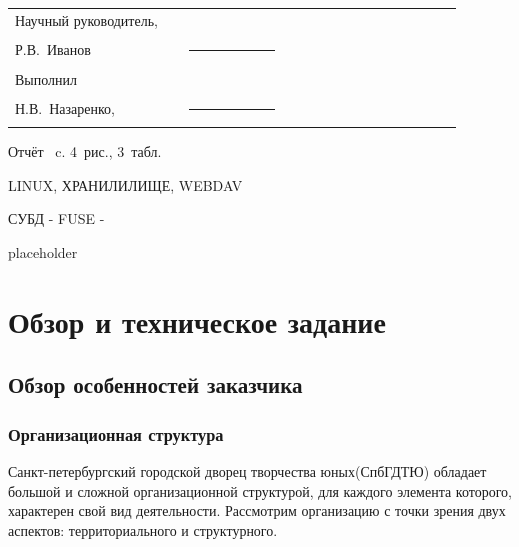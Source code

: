 \documentclass[utf8,usehyperref,12pt]{G7-32}
\begin{document}

\frontmatter %



\Executors %
\begin{longtable}{p{0.35\linewidth}p{0.2\linewidth}p{0.35\linewidth}}
Научный руководитель, 	&		&	\\
Р.В.~Иванов	&\rule{1\linewidth}{0.1pt}	&  \\ \vspace{1cm}

Выполнил  &		&	\\
Н.В.~Назаренко, & \rule{1\linewidth}{0.1pt}& \\
\end{longtable}

\Referat %
Отчёт \pageref{LastPage}~c. 4~рис., 3~табл.

\MakeUppercase{Linux, хранилилище, webdav}



\tableofcontents

\Defines %
СУБД -
FUSE -


\Introduction

placeholder

\mainmatter %

\chapter{Обзор и техническое задание}

\section{Обзор особенностей заказчика}
\subsection{Организационная структура}
Санкт-петербургский городской дворец творчества юных(СпбГДТЮ) обладает большой и сложной организационной структурой, для каждого 
элемента которого, характерен свой вид деятельности. Рассмотрим организацию с точки зрения двух аспектов: территориального
и структурного.
\end{document}
